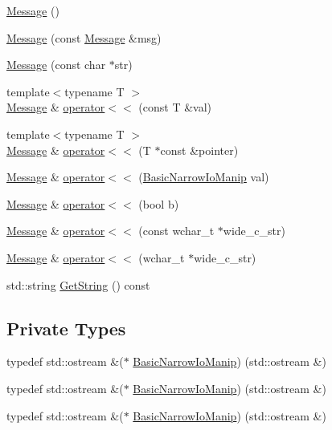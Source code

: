 \begin{DoxyCompactItemize}
\item 
\mbox{\hyperlink{classtesting_1_1_message_af5ba7216630df9845f18feb64b1a5383}{Message}} ()
\item 
\mbox{\hyperlink{classtesting_1_1_message_ac126e24804817a053bebba0920d94a11}{Message}} (const \mbox{\hyperlink{classtesting_1_1_message}{Message}} \&msg)
\item 
\mbox{\hyperlink{classtesting_1_1_message_a9de694ca239486809fc99fbbea8ac21d}{Message}} (const char $\ast$str)
\item 
{\footnotesize template$<$typename T $>$ }\\\mbox{\hyperlink{classtesting_1_1_message}{Message}} \& \mbox{\hyperlink{classtesting_1_1_message_a2e0e71be52d54c20a75a55fca812721f}{operator$<$$<$}} (const T \&val)
\item 
{\footnotesize template$<$typename T $>$ }\\\mbox{\hyperlink{classtesting_1_1_message}{Message}} \& \mbox{\hyperlink{classtesting_1_1_message_aa3ab685879958f90d2d8cd5b68d10c34}{operator$<$$<$}} (T $\ast$const \&pointer)
\item 
\mbox{\hyperlink{classtesting_1_1_message}{Message}} \& \mbox{\hyperlink{classtesting_1_1_message_a3a71a1c1c8ea52de5852d75483d41453}{operator$<$$<$}} (\mbox{\hyperlink{classtesting_1_1_message_ad398b70e2a11b923cef05c809b0eeb92}{Basic\+Narrow\+Io\+Manip}} val)
\item 
\mbox{\hyperlink{classtesting_1_1_message}{Message}} \& \mbox{\hyperlink{classtesting_1_1_message_a3e1e04f23b1bdfe18adfd59928296346}{operator$<$$<$}} (bool b)
\item 
\mbox{\hyperlink{classtesting_1_1_message}{Message}} \& \mbox{\hyperlink{classtesting_1_1_message_a34774e225944cb6df02db9689d312aae}{operator$<$$<$}} (const wchar\+\_\+t $\ast$wide\+\_\+c\+\_\+str)
\item 
\mbox{\hyperlink{classtesting_1_1_message}{Message}} \& \mbox{\hyperlink{classtesting_1_1_message_aae57eefb3a72a19c11453d630b1d846c}{operator$<$$<$}} (wchar\+\_\+t $\ast$wide\+\_\+c\+\_\+str)
\item 
std\+::string \mbox{\hyperlink{classtesting_1_1_message_a2cdc4df62bdcc9df37651a1cf527704e}{Get\+String}} () const
\end{DoxyCompactItemize}
\subsection*{Private Types}
\begin{DoxyCompactItemize}
\item 
typedef std\+::ostream \&($\ast$ \mbox{\hyperlink{classtesting_1_1_message_ad398b70e2a11b923cef05c809b0eeb92}{Basic\+Narrow\+Io\+Manip}}) (std\+::ostream \&)
\item 
typedef std\+::ostream \&($\ast$ \mbox{\hyperlink{classtesting_1_1_message_ad398b70e2a11b923cef05c809b0eeb92}{Basic\+Narrow\+Io\+Manip}}) (std\+::ostream \&)
\item 
typedef std\+::ostream \&($\ast$ \mbox{\hyperlink{classtesting_1_1_message_ad398b70e2a11b923cef05c809b0eeb92}{Basic\+Narrow\+Io\+Manip}}) (std\+::ostream \&)
\end{DoxyCompactItemize}
